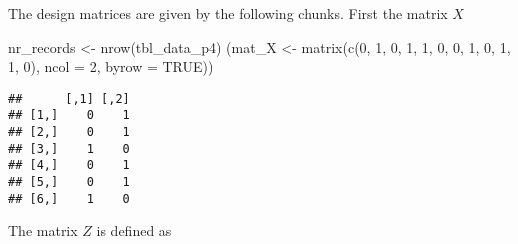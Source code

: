 \documentclass[
]{article}
\newenvironment{Shaded}{\begin{snugshade}}{\end{snugshade}}
\newcommand{\AttributeTok}[1]{\textcolor[rgb]{0.77,0.63,0.00}{#1}}
\newcommand{\ConstantTok}[1]{\textcolor[rgb]{0.00,0.00,0.00}{#1}}
\newcommand{\ControlFlowTok}[1]{\textcolor[rgb]{0.13,0.29,0.53}{\textbf{#1}}}
\newcommand{\DecValTok}[1]{\textcolor[rgb]{0.00,0.00,0.81}{#1}}
\newcommand{\FunctionTok}[1]{\textcolor[rgb]{0.00,0.00,0.00}{#1}}
\newcommand{\NormalTok}[1]{#1}
\newcommand{\OtherTok}[1]{\textcolor[rgb]{0.56,0.35,0.01}{#1}}
\newcommand{\SpecialCharTok}[1]{\textcolor[rgb]{0.00,0.00,0.00}{#1}}
\begin{document}
The design matrices are given by the following chunks. First the matrix
\(X\)

\begin{Shaded}
\begin{Highlighting}[]
\NormalTok{nr\_records }\OtherTok{\textless{}{-}} \FunctionTok{nrow}\NormalTok{(tbl\_data\_p4)}
\NormalTok{(mat\_X }\OtherTok{\textless{}{-}} \FunctionTok{matrix}\NormalTok{(}\FunctionTok{c}\NormalTok{(}\DecValTok{0}\NormalTok{, }\DecValTok{1}\NormalTok{,}
                  \DecValTok{0}\NormalTok{, }\DecValTok{1}\NormalTok{,}
                  \DecValTok{1}\NormalTok{, }\DecValTok{0}\NormalTok{,}
                  \DecValTok{0}\NormalTok{, }\DecValTok{1}\NormalTok{,}
                  \DecValTok{0}\NormalTok{, }\DecValTok{1}\NormalTok{,}
                  \DecValTok{1}\NormalTok{, }\DecValTok{0}\NormalTok{), }\AttributeTok{ncol =} \DecValTok{2}\NormalTok{, }\AttributeTok{byrow =} \ConstantTok{TRUE}\NormalTok{))}
\end{Highlighting}
\end{Shaded}

\begin{verbatim}
##      [,1] [,2]
## [1,]    0    1
## [2,]    0    1
## [3,]    1    0
## [4,]    0    1
## [5,]    0    1
## [6,]    1    0
\end{verbatim}

The matrix \(Z\) is defined as

\begin{Shaded}
\end{Shaded}
\end{document}
